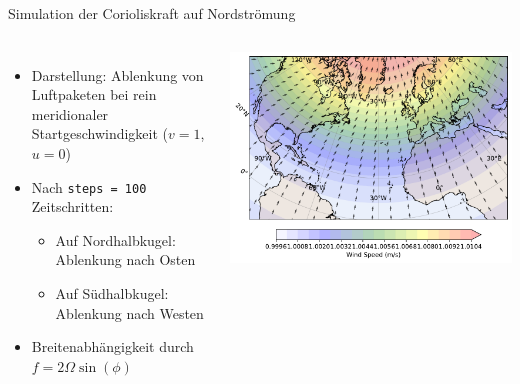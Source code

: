 \begin{frame}{Simulation der Corioliskraft auf Nordströmung}
	\begin{columns}
		\begin{itemize}
			\item Darstellung: Ablenkung von Luftpaketen bei rein meridionaler Startgeschwindigkeit (\(v = 1\), \(u = 0\))
			\item Nach \texttt{steps = 100} Zeitschritten:
			      \begin{itemize}
				      \item Auf Nordhalbkugel: Ablenkung nach Osten
				      \item Auf Südhalbkugel: Ablenkung nach Westen
			      \end{itemize}
			\item Breitenabhängigkeit durch \(f = 2 \Omega \sin(\phi)\)
		\end{itemize}

		\includegraphics[width=\linewidth]{../images/coriolis_effect_plot.pdf}
	\end{columns}
\end{frame}

